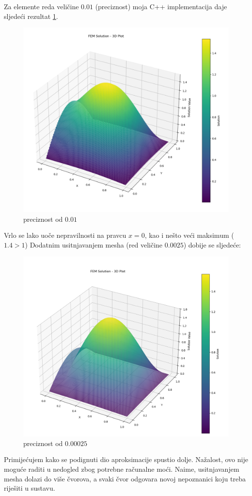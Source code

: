 \documentclass[zavrsnirad]{../fer}
\begin{document}
\newpage
Za elemente reda veličine $0.01$ (preciznost) moja C++ implementacija daje sljedeći 
rezultat \ref{numerSinSin001}.
\begin{figure}[H]
	\centering
  \includegraphics[width=1.2\linewidth]{Figures/numersinsin001.png}
	\caption{preciznost od $0.01$}
  \label{numerSinSin001}
\end{figure}
Vrlo se lako uoče nepravilnosti na pravcu $x=0$, 
kao i nešto veći maksimum ($1.4 > 1$)
\newpage
Dodatnim usitnjavanjem mesha (red veličine $0.0025$)
dobije se sljedeće:
\begin{figure}[H]
	\centering
	\includegraphics[width=1.2\linewidth]{Figures/numersinsin00025.png}
	\caption{preciznost od $0.00025$}
  \label{numerSinSin00025}
\end{figure}
Primijećujem kako se podignuti dio aproksimacije spustio dolje.
Nažalost, ovo nije moguće raditi u nedogled zbog potrebne 
računalne moći. Naime, usitnjavanjem mesha dolazi do više čvorova, a 
svaki čvor odgovara novoj nepoznanici koju treba riješiti u sustavu. 
\end{document}

